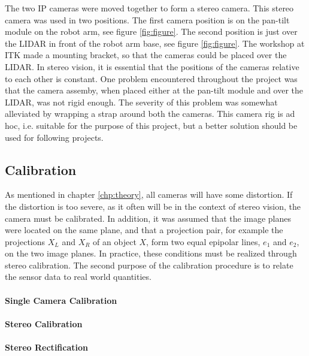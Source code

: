 The two IP cameras were moved together to form a stereo camera. This stereo camera was used in two positions. The first camera position is on the pan-tilt module on the robot arm, see figure \ref{fig:figure}. The second position is just over the LIDAR in front of the robot arm base, see figure \ref{fig:figure}.  The workshop at ITK made a mounting bracket, so that the cameras could be placed over the LIDAR. In stereo vision, it is essential that the positions of the cameras relative to each other is constant. One problem encountered throughout the project was that the camera assemby, when placed either at the pan-tilt module and over the LIDAR, was not rigid enough. The severity of this problem was somewhat alleviated by wrapping a strap around both the cameras. This camera rig is ad hoc, i.e. suitable for the purpose of this project, but a better solution should be used for following projects.

\subsection{Calibration}

As mentioned in chapter \ref{chp:theory}, all cameras will have some distortion. If the distortion is too severe, as it often will be in the context of stereo vision, the camera must be calibrated. In addition, it was assumed that the image planes were located on the same plane, and that a projection pair, for example the projections $X_L$ and $X_R$ of an object $X$, form two equal epipolar lines, $e_1$ and $e_2$, on the two image planes. In practice, these conditions must be realized through stereo calibration. The second purpose of the calibration procedure is to relate the sensor data to real world quantities.

\paragraph{Single Camera Calibration}

\paragraph{Stereo Calibration}

\paragraph{Stereo Rectification}



